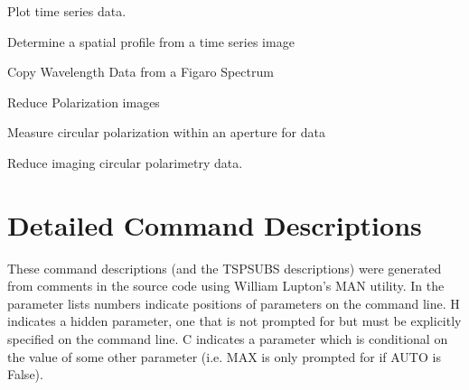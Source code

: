 \begin{mansectionroutines}
        Plot time series data.

        Determine a spatial profile from a time series image

        Copy Wavelength Data from a Figaro Spectrum

        Reduce {} Polarization images

        Measure circular polarization within an aperture for {} data

        Reduce {} imaging circular polarimetry data.

\end{mansectionroutines}



\newpage

\section{Detailed Command Descriptions}

These command descriptions (and the TSPSUBS descriptions) were generated from
comments in the source code using William Lupton's MAN utility. In the
parameter lists numbers indicate positions of parameters on the command
line. H indicates a hidden parameter, one that is not prompted for but must
be explicitly specified on the command line. C indicates a parameter which
is conditional on the value of some other parameter (i.e. MAX is only prompted
for if AUTO is False).


